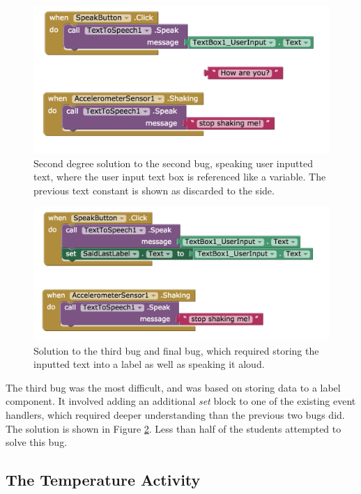 \begin{figure}
  \centering
      \includegraphics[width=\textwidth]{images/debugActivity/debug2input}
  \caption[Second Degree Solution to the Second Bug]{Second degree solution to the second bug, speaking user inputted text, where the user input text box is referenced like a variable. The previous text constant is shown as discarded to the side.}
  \label{fig:debug2}
\end{figure}

\begin{figure}
  \centering
      \includegraphics[width=\textwidth]{images/debugActivity/debug3saidlast}
  \caption[Solution to the Final Bug]{Solution to the third bug and final bug, which required storing the inputted text into a label as well as speaking it aloud.}
  \label{fig:debug3}
\end{figure}

The third bug was the most difficult, and was based on storing data to a label component. It involved adding an additional \emph{set} block to one of the existing event handlers, which required deeper understanding than the previous two bugs did. The solution is shown in Figure \ref{fig:debug3}. Less than half of the students attempted to solve this bug.


\subsection{The Temperature Activity}

